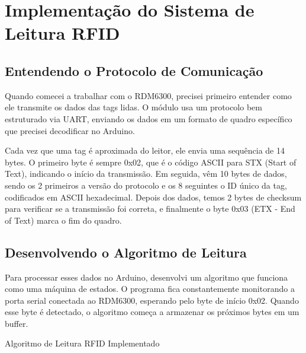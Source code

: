 \section{Implementação do Sistema de Leitura RFID}
\label{sec:implementacao-rfid}

\subsection{Entendendo o Protocolo de Comunicação}

Quando comecei a trabalhar com o RDM6300, precisei primeiro entender como ele transmite os dados das tags lidas. O módulo usa um protocolo bem estruturado via UART, enviando os dados em um formato de quadro específico que precisei decodificar no Arduino.

Cada vez que uma tag é aproximada do leitor, ele envia uma sequência de 14 bytes. O primeiro byte é sempre 0x02, que é o código ASCII para STX (Start of Text), indicando o início da transmissão. Em seguida, vêm 10 bytes de dados, sendo os 2 primeiros a versão do protocolo e os 8 seguintes o ID único da tag, codificados em ASCII hexadecimal. Depois dos dados, temos 2 bytes de checksum para verificar se a transmissão foi correta, e finalmente o byte 0x03 (ETX - End of Text) marca o fim do quadro.

\subsection{Desenvolvendo o Algoritmo de Leitura}

Para processar esses dados no Arduino, desenvolvi um algoritmo que funciona como uma máquina de estados. O programa fica constantemente monitorando a porta serial conectada ao RDM6300, esperando pelo byte de início 0x02. Quando esse byte é detectado, o algoritmo começa a armazenar os próximos bytes em um buffer.

\begin{algorithm}[H]
\caption{Algoritmo de Leitura RFID Implementado}
\label{algo:leitura-rfid}
\end{algorithm}


